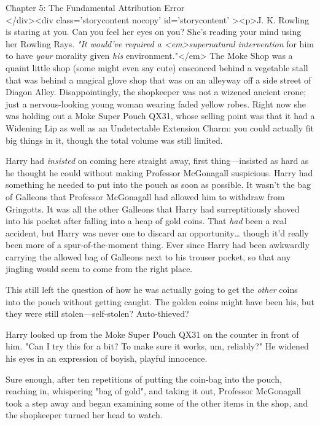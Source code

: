 
Chapter 5: The Fundamental Attribution Error\\
</div><div  class='storycontent nocopy' id='storycontent' ><p>J. K. Rowling is staring at you. Can you feel her eyes on you? She's reading your mind using her Rowling Rays.
\sbreak
\emph{"It would've required a <em>supernatural intervention} for him to have \emph{your} morality given \emph{his} environment."</em>
\sbreak
The Moke Shop was a quaint little shop (some might even say cute) ensconced behind a vegetable stall that was behind a magical glove shop that was on an alleyway off a side street of Diagon Alley. Disappointingly, the shopkeeper was not a wizened ancient crone; just a nervous-looking young woman wearing faded yellow robes. Right now she was holding out a Moke Super Pouch QX31, whose selling point was that it had a Widening Lip as well as an Undetectable Extension Charm: you could actually fit big things in it, though the total volume was still limited.

Harry had \emph{insisted} on coming here straight away, first thing---insisted as hard as he thought he could without making Professor McGonagall suspicious. Harry had something he needed to put into the pouch as soon as possible. It wasn't the bag of Galleons that Professor McGonagall had allowed him to withdraw from Gringotts. It was all the other Galleons that Harry had surreptitiously shoved into his pocket after falling into a heap of gold coins. That \emph{had} been a real accident, but Harry was never one to discard an opportunity{\ldots} though it'd really been more of a spur-of-the-moment thing. Ever since Harry had been awkwardly carrying the allowed bag of Galleons next to his trouser pocket, so that any jingling would seem to come from the right place.

This still left the question of how he was actually going to get the \emph{other} coins into the pouch without getting caught. The golden coins might have been his, but they were still stolen---self-stolen? Auto-thieved?

Harry looked up from the Moke Super Pouch QX31 on the counter in front of him. "Can I try this for a bit? To make sure it works, um, reliably?" He widened his eyes in an expression of boyish, playful innocence.

Sure enough, after ten repetitions of putting the coin-bag into the pouch, reaching in, whispering "bag of gold", and taking it out, Professor McGonagall took a step away and began examining some of the other items in the shop, and the shopkeeper turned her head to watch.

